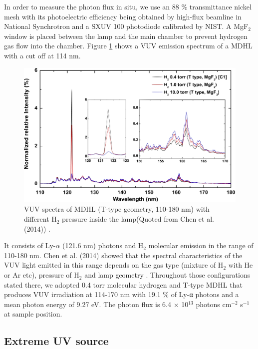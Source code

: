 In order to measure the photon flux in situ, we use an 88 \% transmittance nickel mesh with its photoelectric efficiency being obtained by high-flux beamline in National Synchrotron and a SXUV 100 photodiode calibrated by NIST. A MgF$_2$ window is placed between the lamp and the main chamber to prevent hydrogen gas flow into the chamber. Figure \ref{fig:MDHL} shows a VUV emission spectrum of a MDHL with a cut off at 114 nm.
\begin{figure}
\centering
\includegraphics[width=\textwidth]{figures/chapter2/MDHL.png}
\caption{VUV spectra of MDHL (T-type geometry, 110-180 nm) with different H$_2$ pressure inside the lamp(Quoted from Chen et al. (2014)\cite{chen2013vacuum}) .}
\label{fig:MDHL}
\end{figure}
It consists of Ly-$\alpha$ (121.6 nm) photons and H$_2$ molecular emission in the range of 110-180 nm. Chen et al. (2014)\cite{chen2013vacuum} showed that the spectral characteristics of the VUV light emitted in this range depends on the gas type (mixture of H$_2$ with He or Ar etc), pressure of H$_2$ and lamp geometry \cite{chen2013vacuum}. Throughout those configurations stated there, we adopted 0.4 torr molecular hydrogen and T-type MDHL that produces VUV irradiation at 114-170 nm with 19.1 \% of Ly-α photons and a mean photon energy of 9.27 eV. The photon flux is 6.4 $\times$ 10$^{13}$ photons cm$^{-2}$ s$^{-1}$ at sample position.

\subsection{Extreme UV source}
\label{sec:Extreme_EUV_source}

